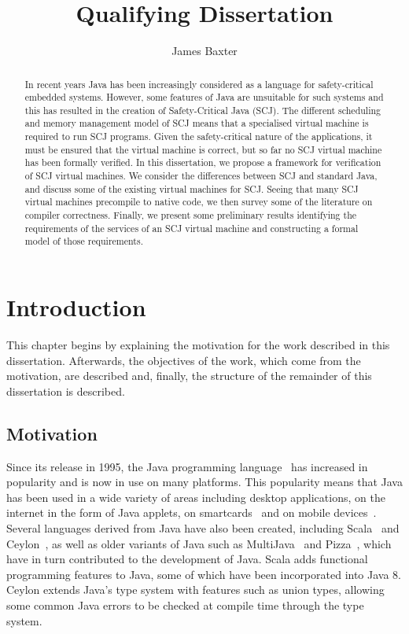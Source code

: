 \documentclass[a4paper,10pt]{report}
\title{Qualifying Dissertation}
\author{James Baxter}
\date{}
\begin{document}
\maketitle

\begin{abstract}
  In recent years Java has been increasingly considered as a language
  for safety-critical embedded systems.
  However, some features of Java are unsuitable for such systems and
  this has resulted in the creation of Safety-Critical Java (SCJ).
  The different scheduling and memory management model of SCJ means
  that a specialised virtual machine is required to run SCJ programs.
  Given the safety-critical nature of the applications, it must be
  ensured that the virtual machine is correct, but so far no SCJ
  virtual machine has been formally verified.
  In this dissertation, we propose a framework for verification of SCJ
  virtual machines.
  We consider the differences between SCJ and standard Java, and
  discuss some of the existing virtual machines for SCJ.
  Seeing that many SCJ virtual machines precompile to native code, we
  then survey some of the literature on compiler correctness.
  Finally, we present some preliminary results identifying the
  requirements of the services of an SCJ virtual machine and
  constructing a formal model of those requirements.
\end{abstract}

\tableofcontents

\chapter{Introduction}

This chapter begins by explaining the motivation for the work
described in this dissertation.
Afterwards, the objectives of the work, which come from the
motivation, are described and, finally, the structure of the remainder
of this dissertation is described.

\section{Motivation}

Since its release in 1995, the Java programming
language~\cite{gosling2013} has increased in popularity and is now in
use on many platforms.
This popularity means that Java has been used in a wide variety of
areas including desktop applications, on the internet in the form of
Java applets, on smartcards~\cite{chen2000} and on mobile
devices~\cite{oracle2014}.
Several languages derived from Java have also been created, including
Scala~\cite{lausanne2015} and Ceylon~\cite{redhat2015}, as well as
older variants of Java such as MultiJava~\cite{clifton2006} and
Pizza~\cite{odersky1997}, which have in turn contributed to the
development of Java.
Scala adds functional programming features to Java, some of which have
been incorporated into Java 8.
Ceylon extends Java's type system with features such as union types,
allowing some common Java errors to be checked at compile time through
the type system.
\end{document}
